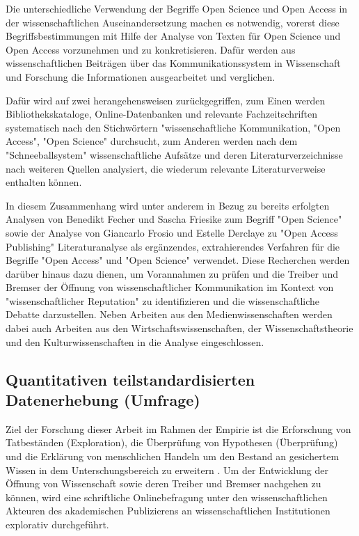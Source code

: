 Die unterschiedliche Verwendung der Begriffe Open Science und Open Access in der wissenschaftlichen Auseinandersetzung machen es notwendig, vorerst diese Begriffsbestimmungen mit Hilfe der Analyse von Texten für Open Science und Open Access vorzunehmen und zu konkretisieren. Dafür werden aus wissenschaftlichen Beiträgen über das Kommunikationssystem in Wissenschaft und Forschung die Informationen ausgearbeitet und verglichen.

Dafür wird auf zwei herangehensweisen zurückgegriffen, zum Einen werden Bibliothekskataloge, Online-Datenbanken und relevante Fachzeitschriften systematisch nach den Stichwörtern "wissenschaftliche Kommunikation, "Open Access", "Open Science" durchsucht, zum Anderen werden nach dem "Schneeballsystem" wissenschaftliche Aufsätze und deren Literaturverzeichnisse nach weiteren Quellen analysiert, die wiederum relevante Literaturverweise enthalten können.

In diesem Zusammenhang wird unter anderem in Bezug zu bereits erfolgten Analysen von Benedikt Fecher und Sascha Friesike zum Begriff "Open Science"\cite{cite:9} sowie der Analyse von Giancarlo Frosio und Estelle Derclaye zu "Open Access Publishing" \cite{CREATe_2014} Literaturanalyse als ergänzendes, extrahierendes Verfahren für die Begriffe "Open Access" und "Open Science" verwendet. Diese Recherchen werden darüber hinaus dazu dienen, um Vorannahmen zu prüfen und die Treiber und Bremser der Öffnung von wissenschaftlicher Kommunikation im Kontext von "wissenschaftlicher Reputation" zu identifizieren und die wissenschaftliche Debatte darzustellen. Neben Arbeiten aus den Medienwissenschaften werden dabei auch Arbeiten aus den Wirtschaftswissenschaften, der Wissenschaftstheorie und den Kulturwissenschaften in die Analyse eingeschlossen.

\subsection{Quantitativen teilstandardisierten Datenerhebung (Umfrage)}

Ziel der Forschung dieser Arbeit im Rahmen der Empirie ist die Erforschung von Tatbeständen (Exploration), die Überprüfung von Hypothesen (Überprüfung) \cite{raab_2012_fragebogen} und die Erklärung von menschlichen Handeln \cite{atteslander_2008_methoden} um den Bestand an gesichertem Wissen in dem Unterschungsbereich zu erweitern \cite{bortz_Doering_2006_fragestellung}. Um der Entwicklung der Öffnung von Wissenschaft sowie deren Treiber und Bremser nachgehen zu können, wird eine schriftliche Onlinebefragung unter den wissenschaftlichen Akteuren des akademischen Publizierens an wissenschaftlichen Institutionen explorativ durchgeführt.

